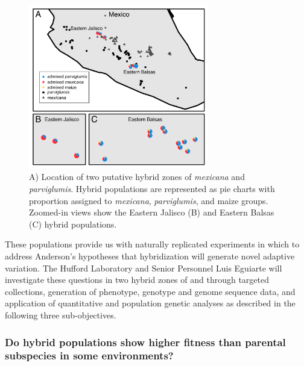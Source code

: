 \begin{figure}[h!]
  \centering
   \includegraphics[width=0.7\textwidth]{Figure1.jpg}
    \caption{A) Location of two putative hybrid zones of \emph{mexicana} and \emph{parviglumis}.  Hybrid populations are represented as pie charts with proportion assigned to \emph{mexicana}, \emph{parviglumis}, and maize groups. Zoomed-in views show the Eastern Jalisco (B) and Eastern Balsas (C) hybrid populations.} 
\label{fig:pies}
\end{figure}

These populations provide us with naturally replicated experiments in which to address Anderson's \citeyearpar{Anderson1954} hypotheses that hybridization will generate novel adaptive variation. 
The Hufford Laboratory and Senior Personnel Luis Eguiarte will investigate these questions in two hybrid zones of \zm{} and \zp{} through targeted collections, generation of phenotype, genotype and genome sequence data, and application of quantitative and population genetic analyses as described in the following three sub-objectives.

\subsubsection{Do hybrid populations show higher fitness than parental subspecies in some environments?} 
\label{sss:fitness}

